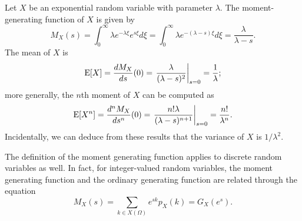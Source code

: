 \begin{example}
Let $X$ be an exponential random variable with parameter $\lambda$.
The moment-generating function of $X$ is given by
\begin{equation*}
M_X (s) = \int_0^{\infty} \lambda e^{-\lambda \xi} e^{s\xi} d\xi
= \int_0^{\infty} \lambda e^{-(\lambda-s) \xi} d\xi
= \frac{\lambda}{\lambda - s} .
\end{equation*}
The mean of $X$ is
\begin{equation*}
\mathrm{E} [X] = \frac{d M_X }{ds} (0)
= \left. \frac{\lambda}{(\lambda - s)^2} \right|_{s=0}
= \frac{1}{\lambda} ;
\end{equation*}
more generally, the $n$th moment of $X$ can be computed as
\begin{equation*}
\mathrm{E} [X^n] = \frac{d^n M_X }{ds^n} (0)
= \left. \frac{n! \lambda}{(\lambda - s)^{n+1}} \right|_{s=0}
= \frac{n!}{\lambda^n} .
\end{equation*}
Incidentally, we can deduce from these results that the variance of $X$ is $1/\lambda^2$.
\end{example}

The definition of the moment generating function applies to discrete random variables as well.
In fact, for integer-valued random variables, the moment generating function and the ordinary generating function are related through the equation  
\begin{equation*}
M_X (s) = \sum_{k \in X(\Omega)} e^{sk} p_X(k) = G_X (e^s) .
\end{equation*}

